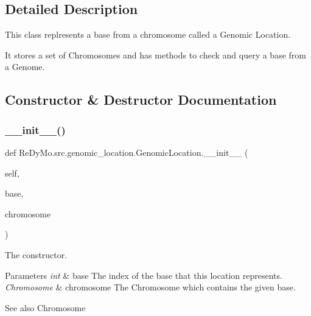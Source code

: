 \subsection{Detailed Description}
This class replresents a base from a chromosome called a Genomic Location. 

It stores a set of Chromosomes and has methods to check and query a base from a Genome. 

\subsection{Constructor \& Destructor Documentation}
\mbox{\label{classReDyMo_1_1src_1_1genomic__location_1_1GenomicLocation_ad2fc819130c39efcd02df0b35e6305b3}} 
\subsubsection{\texorpdfstring{\+\_\+\+\_\+init\+\_\+\+\_\+()}{\_\_init\_\_()}}
{\footnotesize\ttfamily def Re\+Dy\+Mo.\+src.\+genomic\+\_\+location.\+Genomic\+Location.\+\_\+\+\_\+init\+\_\+\+\_\+ (\begin{DoxyParamCaption}\item[{}]{self,  }\item[{}]{base,  }\item[{}]{chromosome }\end{DoxyParamCaption})}



The constructor. 


\begin{DoxyParams}{Parameters}
{\em int} & base The index of the base that this location represents. \\
\hline
{\em Chromosome} & chromosome The Chromosome which contains the given base. \\
\hline
\end{DoxyParams}
\begin{DoxySeeAlso}{See also}
Chromosome 
\end{DoxySeeAlso}


